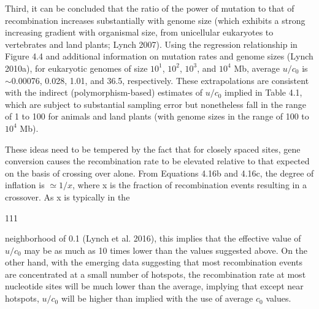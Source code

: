 \documentclass{article}
\begin{document}
Third, it can be concluded that the ratio of the power of mutation to that of recombination increases substantially with genome size (which exhibits a strong increasing gradient with organismal size, from unicellular eukaryotes to vertebrates and land plants; Lynch 2007). Using the regression relationship in Figure 4.4 and additional information on mutation rates and genome sizes (Lynch 2010a), for eukaryotic genomes of size  $ 10^1 $,  $ 10^2 $,  $ 10^3 $, and  $ 10^4 $ Mb, average  $ u/c_0 $ is  $ \sim $0.00076, 0.028, 1.01, and 36.5, respectively. These extrapolations are consistent with the indirect (polymorphism-based) estimates of  $ u/c_0 $ implied in Table 4.1, which are subject to substantial sampling error but nonetheless fall in the range of 1 to 100 for animals and land plants (with genome sizes in the range of 100 to  $ 10^4 $ Mb).

These ideas need to be tempered by the fact that for closely spaced sites, gene conversion causes the recombination rate to be elevated relative to that expected on the basis of crossing over alone. From Equations 4.16b and 4.16c, the degree of inflation is  $ \simeq1/x $, where x is the fraction of recombination events resulting in a crossover. As x is typically in the

111

neighborhood of 0.1 (Lynch et al. 2016), this implies that the effective value of  $ u/c_0 $ may be as much as 10 times lower than the values suggested above. On the other hand, with the emerging data suggesting that most recombination events are concentrated at a small number of hotspots, the recombination rate at most nucleotide sites will be much lower than the average, implying that except near hotspots,  $ u/c_0 $ will be higher than implied with the use of average  $ c_0 $ values.
\end{document}
